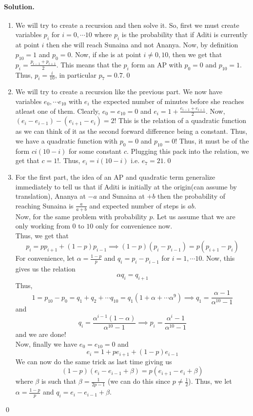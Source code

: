 \documentclass[12pt]{article}
\newenvironment{solution}
{\paragraph{Solution.}}
{\qed\eject}
\begin{document}
\begin{solution}
\begin{enumerate}
    \item We will try to create a recursion and then solve it. So, first we must create variables $p_i$ for $i=0,\cdots 10$ where $p_i$ is the probability that if Aditi is currently at point $i$ then she will reach Sunaina and not Ananya. Now, by definition $p_{10}=1$ and $p_0=0$. Now, if she is at point $i\ne 0,10$, then we get that $p_{i}=\frac{p_{i-1}+p_{i+1}}{2}$. This means that the $p_i$ form an AP with $p_0=0$ and $p_{10}=1$. Thus, $p_i=\frac{i}{10}$, in particular $p_7=0.7$.\qed 
    \item We will try to create a recursion like the previous part. We now have variables $e_0,\cdots e_{10}$ with $e_i$ the expected number of minutes before she reaches atleast one of them. Clearly, $e_0=e_{10}=0$ and $e_i=1+\frac{e_{i-1}+e_{i+1}}{2}$. Now, $(e_{i}-e_{i-1})-(e_{i+1}-e_i)=2$! This is the relation of a quadratic function as we can think of it as the second forward difference being a constant. Thus, we have a quadratic function with $p_0=0$ and $p_{10}=0$! Thus, it must be of the form $ci(10-i)$ for some constant $c$. Plugging this pack into the relation, we get that $c=1$!. Thus, $e_i=i(10-i)$ i.e. $e_7=21$.\qed
    \item For the first part, the idea of an AP and quadratic term generalize immediately to tell us that if Aditi is initially at the origin(can assume by translation), Ananya at $-a$ and Sunaina at $+b$ then the probability of reaching Sunaina is $\frac{a}{a+b}$ and expected number of steps is $ab$.\\
    
    Now, for the same problem with probability $p$. Let us assume that we are only working from $0$ to $10$ only for convenience now.\\

    Thus, we get that \[p_i=pp_{i+1}+(1-p)p_{i-1}\implies (1-p)(p_{i}-p_{i-1})=p(p_{i+1}-p_i)\]
    For convenience, let $\alpha=\frac{1-p}{p}$ and $q_i=p_i-p_{i-1}$ for $i=1,\cdots 10$. Now, this gives us the relation
    \[\alpha q_i=q_{i+1}\]
    Thus, \[1=p_{10}-p_0=q_1+q_2+\cdots q_{10}=q_1(1+\alpha+\cdots \alpha^9)\implies q_1=\frac{\alpha-1}{\alpha^{10}-1}\]
    and \[q_i=\frac{\alpha^{i-1}(1-\alpha)}{\alpha^{10}-1}\implies p_i=\frac{\alpha^i-1}{\alpha^{10}-1}\]
    and we are done!\\

    Now, finally we have $e_0=e_{10}=0$ and \[e_i=1+pe_{i+1}+(1-p)e_{i-1}\]
    We can now do the same trick as last time giving us \[(1-p)(e_i-e_{i-1}+\beta)=p(e_{i+1}-e_i+\beta)\]
    where $\beta$ is such that $\beta=\frac{1}{2p-1}$ (we can do this since $p\ne \frac{1}{2}$). Thus, we let $\alpha=\frac{1-p}{p}$ and $q_i=e_i-e_{i-1}+\beta$.\\


\end{enumerate}
\end{solution}
\end{document}
